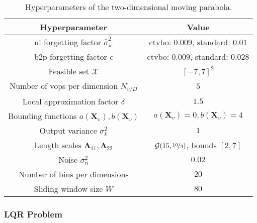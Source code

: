\bgroup
\def\arraystretch{1}
\begin{table}[h]
    \small
    \centering
    \begin{tabular}{c||c}
        \textbf{Hyperparameter} & \textbf{Value} \\\hline\hline
        \gls{ui} forgetting factor $\hat{\sigma}_w^2$ & \gls{ctvbo}: $0.009$, standard: $0.01$\\
        \gls{b2p} forgetting factor $\epsilon$ & \gls{ctvbo}: $0.009$, standard: $0.028$\\
        Feasible set $\mathcal{X}$ & $[-7,7]^2$\\
        Number of \glspl{vop} per dimension $N_{v/D}$ & $5$\\
        Local approximation factor $\delta$ & $1.5$\\
        Bounding functions $a(\mathbf{X}_v),b(\mathbf{X}_v)$ & $a(\mathbf{X}_v)=0,b(\mathbf{X}_v)=4$\\
        Output variance $\sigma_k^2$ & $1$\\
        Length scales $\boldsymbol\Lambda_{11}, \boldsymbol\Lambda_{22}$ & $\mathcal{G}(15, \nicefrac{10}{3})$, bounds $[2, 7]$\\
        Noise $\sigma_n^2$ & $0.02$ \\
        Number of bins per dimensions & $20$ \\
        Sliding window size $W$ & $80$
    \end{tabular}
    \caption{Hyperparameters of the two-dimensional moving parabola.}
    \label{tab:params_parabola_2D}
\end{table}
\egroup

\newpage
\subsubsection{LQR Problem}

